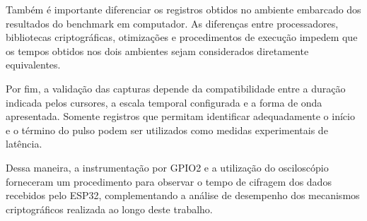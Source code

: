 Também é importante diferenciar os registros obtidos no ambiente embarcado dos resultados do benchmark em computador. As diferenças entre processadores, bibliotecas criptográficas, otimizações e procedimentos de execução impedem que os tempos obtidos nos dois ambientes sejam considerados diretamente equivalentes.

Por fim, a validação das capturas depende da compatibilidade entre a duração indicada pelos cursores, a escala temporal configurada e a forma de onda apresentada. Somente registros que permitam identificar adequadamente o início e o término do pulso podem ser utilizados como medidas experimentais de latência.

Dessa maneira, a instrumentação por GPIO2 e a utilização do osciloscópio forneceram um procedimento para observar o tempo de cifragem dos dados recebidos pelo ESP32, complementando a análise de desempenho dos mecanismos criptográficos realizada ao longo deste trabalho.
